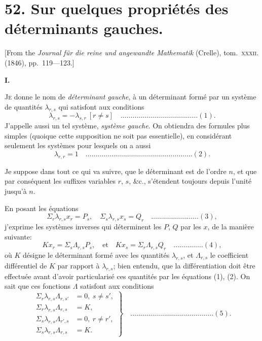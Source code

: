 \documentclass[11pt,a4paper]{book}
\begin{document}
\newpage


\section*{52. Sur quelques propri\'et\'es des d\'eterminants gauches.}

[From the \textit{Journal f\"ur die reine und angewandte Mathematik} (Crelle), tom.~\textsc{xxxii}. (1846), pp.~119---123.]

\bigskip

\textbf{I.}

\textsc{Je} donne le nom de \textit{d\'eterminant gauche}, \`a un d\'eterminant form\'e par un syst\`eme de quantit\'es $\lambda_{r,s}$ qui satisfont aux conditions
\[
\lambda_{r,s} = -\lambda_{s,r}\ [r \neq s] \quad \ldots \ldots \ldots \ldots \ldots \ldots \ldots \ldots \ldots \ldots \ldots \ldots \ldots (1).
\]
J'appelle aussi un tel syst\`eme, \textit{syst\`eme gauche}. On obtiendra des formules plus simples (quoique cette supposition ne soit pas essentielle), en consid\'erant seulement les syst\`emes pour lesquels on a aussi
\[
\lambda_{r,r} = 1 \quad \ldots \ldots \ldots \ldots \ldots \ldots \ldots \ldots \ldots \ldots \ldots \ldots \ldots \ldots \ldots \ldots \ldots \ldots (2).
\]

Je suppose dans tout ce qui va suivre, que le d\'eterminant est de l'ordre $n$, et que par cons\'equent les suffixes variables $r$, $s$, \&c., s'\'etendent toujours depuis l'unit\'e jusqu'\`a $n$.

En posant les \'equations
\[
\Sigma_r \lambda_{r,s} x_r = P_s, \quad \Sigma_s \lambda_{r,s} x_s = Q_r \quad \ldots \ldots \ldots \ldots \ldots \ldots \ldots \ldots (3),
\]
j'exprime les syst\`emes inverses qui d\'eterminent les $P$, $Q$ par les $x$, de la mani\`ere suivante:
\[
K x_r = \Sigma_s \Lambda_{r,s} P_s, \quad \text{et} \quad K x_s = \Sigma_r \Lambda_{r,s} Q_r \quad \ldots \ldots \ldots \ldots \ldots (4),
\]
o\`u $K$ d\'esigne le d\'eterminant form\'e avec les quantit\'es $\lambda_{r,s}$, et $\Lambda_{r,s}$ le coefficient diff\'erentiel de $K$ par rapport \`a $\lambda_{r,s}$; bien entendu, que la diff\'erentiation doit \^etre effectu\'ee avant d'avoir particularis\'e ces quantit\'es par les \'equations (1), (2). On sait que ces fonctions $\Lambda$ satisfont aux conditions
\[
\left. \begin{aligned}
\Sigma_r \lambda_{r,s} \Lambda_{r,s'} &= 0,\ s \neq s', \\
\Sigma_r \lambda_{r,s} \Lambda_{r,s} &= K, \\
\Sigma_s \lambda_{r,s} \Lambda_{r',s} &= 0,\ r \neq r', \\
\Sigma_s \lambda_{r,s} \Lambda_{r,s} &= K.
\end{aligned} \right\} \quad \ldots \ldots \ldots \ldots \ldots \ldots \ldots \ldots \ldots \ldots \ldots \ldots \ldots \ldots (5).
\]
\end{document}
